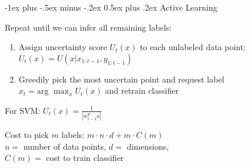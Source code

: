 \documentclass[11pt,landscape]{article}
\makeatletter
\renewcommand{\section}{\@startsection{section}{1}{0mm}%
                                {-1ex plus -.5ex minus -.2ex}%
                                {0.5ex plus .2ex}%
                                {\normalfont\normalsize\bfseries}}
\makeatother
\begin{document}
\begin{multicols}{3}
\section{Active Learning}
\begin{description}
    \item[Uncertainty sampling] Repeat until we can infer all remaining labels:
    \begin{enumerate}
        \item Assign uncertainty score $U_t(x)$ to each unlabeled data point:
        $U_t(x) = U \left ( x | x_{1:t-1},y_{1:t-1} \right )$
        \item Greedily pick the most uncertain point and request label
        $x_t = \text{arg } \max_x U_t(x)$ and retrain classifier
    \end{enumerate}
    \item For SVM: $U_t(x) = \frac{1}{|w_{t-1}^T x|}$
    \item Cost to pick $m$ labels: $m \cdot n \cdot d + m \cdot C(m)$\\
        $n =$ number of data points, $d =$ dimensions,\\
        $C(m) =$ cost to train classifier


\end{description}
\end{multicols}
\end{document}
